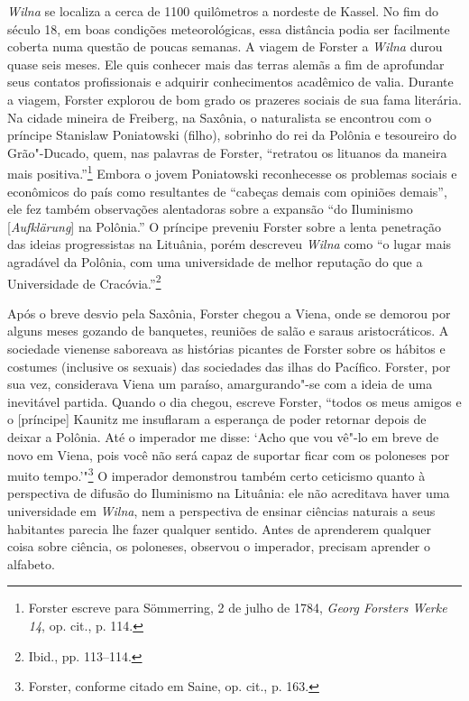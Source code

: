\textit{Wilna} se localiza a cerca de 1100 quilômetros a nordeste de Kassel. No
fim do século 18, em boas condições meteorológicas, essa distância podia
ser facilmente coberta numa questão de poucas semanas. A viagem de
Forster a \textit{Wilna} durou quase seis meses. Ele quis conhecer mais das
terras alemãs a fim de aprofundar seus contatos profissionais e adquirir
conhecimentos acadêmico de valia. Durante a viagem, Forster explorou de
bom grado os prazeres sociais de sua fama literária. Na cidade mineira
de Freiberg, na Saxônia, o naturalista se encontrou com o príncipe
Stanislaw Poniatowski (filho), sobrinho do rei da Polônia e tesoureiro
do Grão"-Ducado, quem, nas palavras de Forster, ``retratou os lituanos da
maneira mais positiva.''\footnote{Forster escreve para Sömmerring, 2 de julho de 1784, \textit{Georg Forsters Werke 14}, op. cit., p. 114.} Embora o jovem Poniatowski reconhecesse os problemas sociais e
econômicos do país como resultantes de ``cabeças demais com opiniões
demais'', ele fez também observações alentadoras sobre a expansão ``do
Iluminismo {[}\textit{Aufklärung}{]} na Polônia.'' O príncipe preveniu
Forster sobre a lenta penetração das ideias progressistas na Lituânia,
porém descreveu \textit{Wilna} como ``o lugar mais agradável da Polônia, com uma
universidade de melhor reputação do que a Universidade de
Cracóvia.''\footnote{Ibid., pp. 113--114.}

%

Após o breve desvio pela Saxônia, Forster chegou a Viena, onde se
demorou por alguns meses gozando de banquetes, reuniões de salão e
saraus aristocráticos. A sociedade vienense saboreava as histórias
picantes de Forster sobre os hábitos e costumes (inclusive os sexuais)
das sociedades das ilhas do Pacífico. Forster, por sua vez, considerava
Viena um paraíso, amargurando"-se com a ideia de uma inevitável partida.
Quando o dia chegou, escreve Forster, ``todos os meus amigos e o
{[}príncipe{]} Kaunitz me insuflaram a esperança de poder retornar
depois de deixar a Polônia. Até o imperador me disse: `Acho que vou
vê"-lo em breve de novo em Viena, pois você não será capaz de suportar
ficar com os poloneses por muito tempo.'"\footnote{Forster, conforme citado em Saine, op. cit., p. 163.} O imperador demonstrou também certo ceticismo quanto à perspectiva de difusão do Iluminismo na
Lituânia: ele não acreditava haver uma universidade em \textit{Wilna}, nem a
perspectiva de ensinar ciências naturais a seus habitantes parecia lhe
fazer qualquer sentido. Antes de aprenderem qualquer coisa sobre
ciência, os poloneses, observou o imperador, precisam aprender o
alfabeto.

